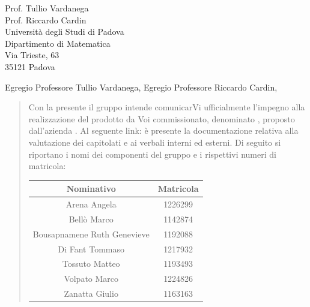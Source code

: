 \documentclass{articoletteracdp}
\date{8 aprile 2022}
\begin{document}
	\begin{letter}{
			Prof. Tullio Vardanega \\
			Prof. Riccardo Cardin \\
			Università degli Studi di Padova \\
			Dipartimento di Matematica \\
			Via Trieste, 63 \\
			35121 Padova
		}

		\opening{Egregio Professore Tullio Vardanega, \newline Egregio Professore Riccardo Cardin,}

		\begin{quotation}
			\noindent
			Con la presente il gruppo \textit{\teamname} intende comunicarVi ufficialmente l'impegno alla realizzazione del prodotto da Voi commissionato, denominato \textit{\progetto}, proposto dall'azienda \textit{\proponente}. \newline
			Al seguente link: \href{\github}{\textit{\github}} è presente la documentazione relativa alla valutazione dei capitolati e ai verbali interni ed esterni. \newline
			Di seguito si riportano i nomi dei componenti del gruppo e i rispettivi numeri di matricola:

			\def\arraystretch{1}
			\begin{table}
				\begin{center}
					\setlength{\extrarowheight}{.75ex}
					\begin{tabular}{ c | c }
						\textbf{Nominativo}           & \textbf{Matricola} \\
						\hline

						Arena Angela{}                & 1226299{}          \\
						Bellò Marco{}                 & 1142874{}          \\
						Bousapnamene Ruth Genevieve{} & 1192088{}          \\
						Di Fant Tommaso{}             & 1217932{}          \\
						Tossuto Matteo{}              & 1193493{}          \\
						Volpato Marco{}               & 1224826{}          \\
						Zanatta Giulio{}              & 1163163{}          \\

						\hline
					\end{tabular}
				\end{center}
			\end{table}
			

\end{quotation}
\end{letter}
\end{document}

